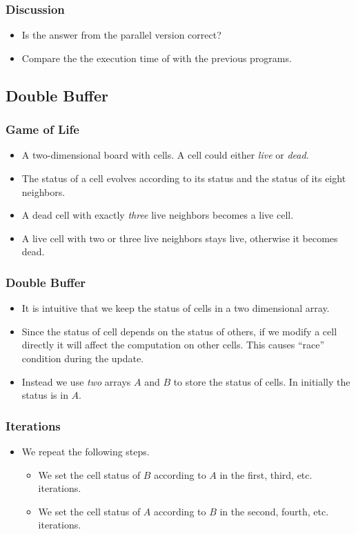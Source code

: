\documentclass{beamer}
\begin{document}
\begin{frame}
  \frametitle{Discussion}
  \begin{itemize}
  \item Is the answer from the parallel version correct? 
  \item Compare the the execution time of with the previous
    programs.
  \end{itemize}
\end{frame}

\subsection{Double Buffer}

\begin{frame}
  \frametitle{Game of Life}
  \begin{itemize}
  \item A two-dimensional board with cells.  A cell could either {\em
    live} or {\em dead}.
  \item The status of a cell evolves according to its status and the
      status of  its eight neighbors.
  \item A dead cell with exactly {\em three} live neighbors becomes
    a live cell. 
  \item A live cell with two or three live neighbors stays live,
    otherwise it becomes dead.
  \end{itemize}
\end{frame}

\begin{frame}
  \frametitle{Double Buffer}
  \begin{itemize}
    \item It is intuitive that we keep the status of cells in a two
      dimensional array.
    \item Since the status of cell depends on the status of others, if
      we modify a cell directly it will affect the computation on
      other cells.  This causes ``race'' condition during the update.
    \item Instead we use {\em two} arrays $A$ and $B$ to store the
      status of cells.  In initially the status is in $A$.
  \end{itemize}
\end{frame}

\begin{frame}
  \frametitle{Iterations}
  \begin{itemize}
    \item We repeat the following steps.
      \begin{itemize}
      \item We set the cell status of $B$ according to $A$ in the
        first, third, etc. iterations.
      \item We set the cell status of $A$ according to $B$ in the
        second, fourth, etc. iterations.
      \end{itemize}
  \end{itemize}
\end{frame}
\end{document}

